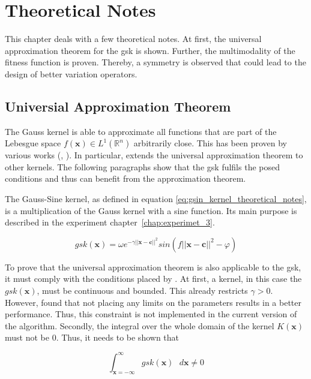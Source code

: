 \documentclass[./\jobname.tex]{subfiles}
\begin{document}
\section{Theoretical Notes}
This chapter deals with a few theoretical notes. At first, the universal approximation theorem for the \gls{gsk} is shown. Further, the multimodality of the fitness function is proven. Thereby, a symmetry is observed that could lead to the design of better variation operators.  

\subsection{Universial Approximation Theorem}
\label{chap:gsin_approximation_theorem}

The Gauss kernel is able to approximate all functions that are part of the Lebesgue space $f(\mathbf{x}) \in L^1(\mathbb{R}^n)$ arbitrarily close. This has been proven by various works (\cite{park_universal_1991}, \cite{hangelbroek_nonlinear_2010}). In particular, \cite{park_universal_1991} extends the universal approximation theorem to other kernels. The following paragraphs show that the \gls{gsk} fulfils the posed conditions and thus can benefit from the approximation theorem. 

The Gauss-Sine kernel, as defined in equation \eqref{eq:gsin_kernel_theoretical_notes}, is a multiplication of the Gauss kernel with a sine function. Its main purpose is described in the experiment \mbox{chapter \ref{chap:experimet_3}}. 

\begin{equation}
\label{eq:gsin_kernel_theoretical_notes}
gsk(\mathbf{x}) = \omega e^{-\gamma ||\mathbf{x} - \mathbf{c}||^2} sin(f ||\mathbf{x} - \mathbf{c}||^2 - \varphi)
\end{equation}

To prove that the universal approximation theorem is also applicable to the \gls{gsk}, it must comply with the conditions placed by \cite{park_universal_1991}. At first, a kernel, in this case the $gsk(\mathbf{x})$, must be continuous and bounded. This already restricts $\gamma > 0$. However, \cite{chaquet_using_2019} found that not placing any limits on the parameters results in a better performance. Thus, this constraint is not implemented in the current version of the algorithm. Secondly, the integral over the whole domain of the kernel $K(\mathbf{x})$ must not be $0$. Thus, it needs to be shown that 

\begin{equation}
\int_{\mathbf{x} = -\mathbf{\infty}}^{\infty} gsk(\mathbf{x}) \text{ } d\mathbf{x} \neq 0
\end{equation} 
\end{document}
